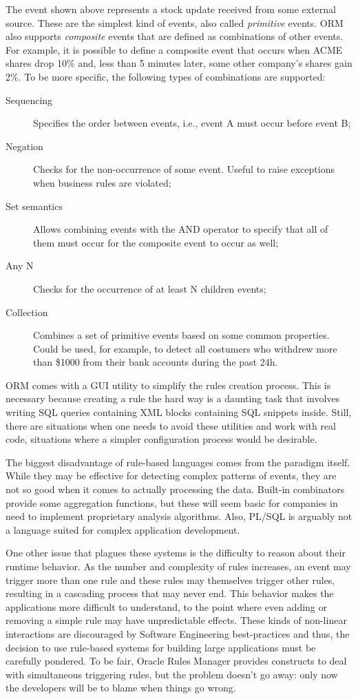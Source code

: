 \documentclass[a4,11pt]{report}
\begin{document}
The event shown above represents a stock update received from some
external source. These are the simplest kind of events, also called
\emph{primitive} events. ORM also supports \emph{composite} events
that are defined as combinations of other events. For example, it is
possible to define a composite event that occurs when ACME shares drop
10\% and, less than 5 minutes later, some other company's shares gain
2\%. To be more specific, the following types of combinations are
supported:
\begin{description}
\item [Sequencing] Specifies the order between events, i.e., event A
  must occur before event B;
\item [Negation] Checks for the non-occurrence of some event. Useful
  to raise exceptions when business rules are violated;
\item [Set semantics] Allows combining events with the AND operator to
  specify that all of them must occur for the composite event to occur
  as well;
\item [Any N] Checks for the occurrence of at least N children events;
\item [Collection] Combines a set of primitive events based on some
  common properties. Could be used, for example, to detect all
  costumers who withdrew more than \$1000 from their bank accounts
  during the past 24h.
\end{description}

ORM comes with a GUI utility to simplify the rules creation
process. This is necessary because creating a rule the hard way is a
daunting task that involves writing SQL queries containing XML blocks
containing SQL snippets inside. Still, there are situations when one
needs to avoid these utilities and work with real code, situations
where a simpler configuration process would be desirable.

The biggest disadvantage of rule-based languages comes from the
paradigm itself. While they may be effective for detecting complex
patterns of events, they are not so good when it comes to actually
processing the data. Built-in combinators provide some aggregation
functions, but these will seem basic for companies in need to
implement proprietary analysis algorithms. Also, PL/SQL is arguably
not a language suited for complex application development.

One other issue that plagues these systems is the difficulty to reason
about their runtime behavior. As the number and complexity of rules
increases, an event may trigger more than one rule and these rules may
themselves trigger other rules, resulting in a cascading process that
may never end. This behavior makes the applications more difficult to
understand, to the point where even adding or removing a simple rule
may have unpredictable effects. These kinds of non-linear interactions
are discouraged by Software Engineering best-practices and thus, the
decision to use rule-based systems for building large applications
must be carefully pondered. To be fair, Oracle Rules Manager provides
constructs to deal with simultaneous triggering rules, but the problem
doesn't go away: only now the developers will be to blame when things
go wrong.
\end{document}
